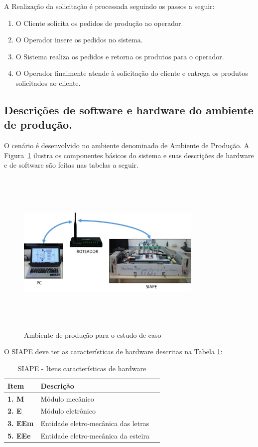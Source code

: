 \documentclass[10pt,letterpaper,twocolumn]{IEEEtran}
\begin{document}
A Realização da  solicitação é processada seguindo os passos a seguir:

\begin{enumerate}
	\item O Cliente solicita os pedidos de produção ao operador.
	\item O Operador insere os pedidos no sistema.
	\item O Sistema realiza os pedidos e retorna os produtos para o operador.
	\item O Operador finalmente atende à solicitação do cliente e entrega os produtos solicitados ao cliente.
\end{enumerate} 

\subsection{Descrições de software e hardware do ambiente de produção.}


O cenário é desenvolvido no ambiente denominado de Ambiente de Produção. A Figura~\ref{F104} ilustra os 
componentes básicos do sistema e suas descrições de hardware e de software são feitas nas tabelas a seguir.

\begin{figure}
	\centering
	\includegraphics[width=8.9cm, height=8cm]{MeDSE_imagens/F104_SIAPE_AMBIENTE.jpg} 
	\caption{Ambiente de produção para o estudo de caso}
	\label{F104}
\end{figure}


O SIAPE deve ter as características de hardware descritas na Tabela \ref{T6}:

\begin{table}
	\centering
	\caption{SIAPE - Itens características  de hardware}
	\begin{tabular}{|p{4cm}| p{11cm}|l| } \hline
		\textbf{ Item }	   & \textbf{ Descrição}	 \\ \hline
		\textbf{1. M }   & Módulo mecânico\\ \hline
		\textbf{2. E}    & Módulo eletrônico\\ \hline
		\textbf{3.  EEm}  & Entidade eletro-mecânica das letras\\ \hline				
		\textbf{5. EEe}	 & Entidade eletro-mecânica da esteira\\ \hline
	\end{tabular}
	\label{T6}\par
\end{table}	
\end{document}
